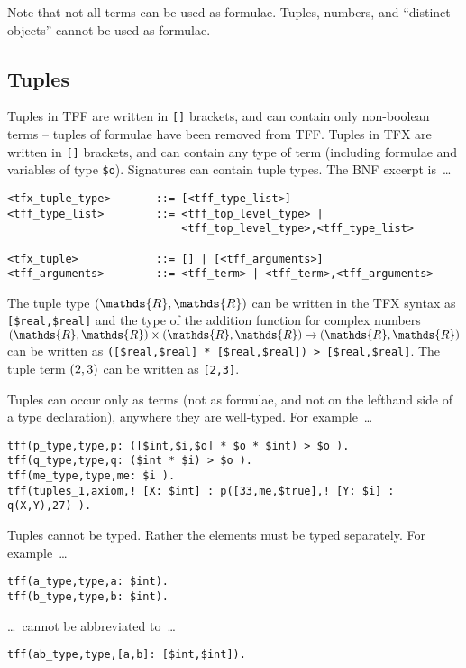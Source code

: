 \documentclass{easychair}
\begin{document}
Note that not all terms can be used as formulae.
Tuples, numbers, and ``distinct objects'' cannot be used as formulae.

\subsection{Tuples}

Tuples in TFF are written in {\tt []} brackets, and can contain only
non-boolean terms -- tuples of formulae have been removed from TFF. 
Tuples in TFX are written in {\tt []} brackets, and can contain any type of 
term (including formulae and variables of type {\tt \$o}). 
Signatures can contain tuple types. 
The BNF excerpt is~\ldots
\begin{verbatim}
<tfx_tuple_type>       ::= [<tff_type_list>]
<tff_type_list>        ::= <tff_top_level_type> |
                           <tff_top_level_type>,<tff_type_list>

<tfx_tuple>            ::= [] | [<tff_arguments>]
<tff_arguments>        ::= <tff_term> | <tff_term>,<tff_arguments>
\end{verbatim}

The tuple type $\tuple{\mathds{R},\mathds{R}}$ can be written in the TFX syntax as \verb|[$real,$real]| and the type of the addition function for complex numbers $\tuple{\mathds{R},\mathds{R}} \times \tuple{\mathds{R},\mathds{R}} \to \tuple{\mathds{R},\mathds{R}}$ can be written as
\verb'([$real,$real] * [$real,$real]) > [$real,$real]'. The tuple term $({2,3})$ can be written as \verb'[2,3]'.

Tuples can occur only as terms (not as formulae, and not on the lefthand side 
of a type declaration), anywhere they are well-typed. 
For example~\ldots
\begin{verbatim}
tff(p_type,type,p: ([$int,$i,$o] * $o * $int) > $o ).
tff(q_type,type,q: ($int * $i) > $o ).
tff(me_type,type,me: $i ).
tff(tuples_1,axiom,! [X: $int] : p([33,me,$true],! [Y: $i] : q(X,Y),27) ).
\end{verbatim}

Tuples cannot be typed. Rather the elements must be typed separately. 
For example~\ldots
\begin{verbatim}
tff(a_type,type,a: $int).
tff(b_type,type,b: $int).
\end{verbatim}
\ldots~cannot be abbreviated to~\ldots
\begin{verbatim}
tff(ab_type,type,[a,b]: [$int,$int]).
\end{verbatim}
\end{document}

